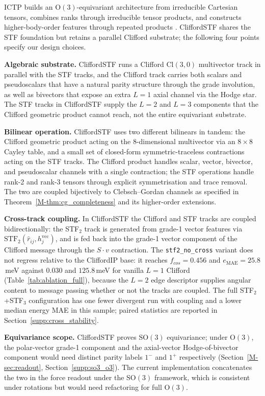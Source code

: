 ICTP builds an $\mathrm{O}(3)$-equivariant architecture from irreducible Cartesian tensors, combines ranks through irreducible tensor products, and constructs higher-body-order features through repeated products \citep{zaverkin2024ictp}. CliffordSTF shares the STF foundation but retains a parallel Clifford substrate; the following four points specify our design choices.

\textbf{Algebraic substrate.} CliffordSTF runs a Clifford $\mathrm{Cl}(3,0)$ multivector track in parallel with the STF tracks, and the Clifford track carries both scalars and pseudoscalars that have a natural parity structure through the grade involution, as well as bivectors that expose an extra $L{=}1$ axial channel via the Hodge star. The STF tracks in CliffordSTF supply the $L{=}2$ and $L{=}3$ components that the Clifford geometric product cannot reach, not the entire equivariant substrate.

\textbf{Bilinear operation.} CliffordSTF uses two different bilinears in tandem: the Clifford geometric product acting on the 8-dimensional multivector via an $8 \times 8$ Cayley table, and a small set of closed-form symmetric-traceless contractions acting on the STF tracks. The Clifford product handles scalar, vector, bivector, and pseudoscalar channels with a single contraction; the STF operations handle rank-2 and rank-3 tensors through explicit symmetrisation and trace removal. The two are coupled bijectively to Clebsch--Gordan channels as specified in Theorem~\ref{M-thm:cg_completeness} and its higher-order extensions.

\textbf{Cross-track coupling.} In CliffordSTF the Clifford and STF tracks are coupled bidirectionally: the STF$_2$ track is generated from grade-1 vector features via $\mathrm{STF}_2(\hat{r}_{ij}, h_j^{\mathrm{vec}})$, and is fed back into the grade-1 vector component of the Clifford message through the $S \cdot v$ contraction. The \texttt{stf2\_no\_cross} variant does not regress relative to the CliffordIP base: it reaches $f_{cos}{=}0.456$ and $e_{\mathrm{MAE}}{=}25.8$\,meV against $0.030$ and $125.8$\,meV for vanilla $L{=}1$ Clifford (Table~\ref{tab:ablation_full}), because the $L{=}2$ edge descriptor supplies angular content to message passing whether or not the tracks are coupled. The full STF$_2$+STF$_3$ configuration has one fewer divergent run with coupling and a lower median energy MAE in this sample; paired statistics are reported in Section~\ref{supp:cross_stability}.

\textbf{Equivariance scope.} CliffordSTF proves $\mathrm{SO}(3)$ equivariance; under $\mathrm{O}(3)$, the polar-vector grade-1 component and the axial-vector Hodge-of-bivector component would need distinct parity labels $1^-$ and $1^+$ respectively (Section~\ref{M-sec:readout}, Section~\ref{supp:so3_o3}). The current implementation concatenates the two in the force readout under the $\mathrm{SO}(3)$ framework, which is consistent under rotations but would need refactoring for full $\mathrm{O}(3)$.

